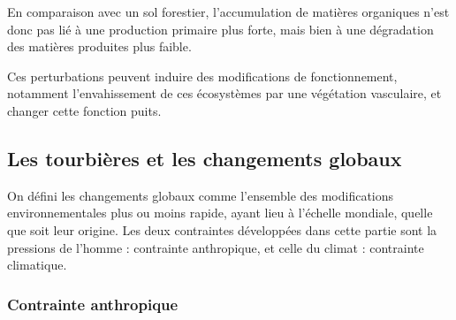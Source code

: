 En comparaison avec un sol forestier, l'accumulation de matières organiques n'est donc pas lié à une production primaire plus forte, mais bien à une dégradation des matières produites plus faible.

Ces perturbations peuvent induire des modifications de fonctionnement, notamment l'envahissement de ces écosystèmes par une végétation vasculaire, et changer cette fonction puits.

%



\subsection{Les tourbières et les changements globaux}
On défini les changements globaux comme l'ensemble des modifications environnementales plus ou moins rapide, ayant lieu à l'échelle mondiale, quelle que soit leur origine. Les deux contraintes développées dans cette partie sont la pressions de l'homme : contrainte anthropique, et celle du climat : contrainte climatique.

\subsubsection{Contrainte anthropique}

